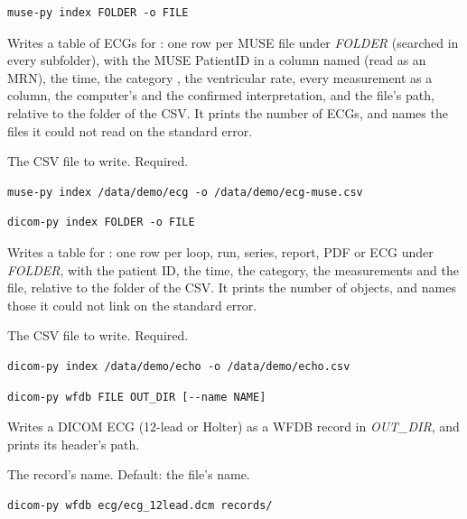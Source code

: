 \begin{lstlisting}[style=signature]
muse-py index FOLDER -o FILE
\end{lstlisting}
Writes a table of ECGs for : one row per MUSE file under \textit{FOLDER} (searched in every
subfolder), with the MUSE PatientID in a column named  (read as an MRN),
the time, the category , the ventricular rate, every measurement as a column, the
computer's and the confirmed interpretation, and the file's path, relative to the folder of the
CSV. It prints the number of ECGs, and names the files it could not
read on the standard error.
\begin{params}
\item[-o, --output FILE] The CSV file to write. Required.
\end{params}
\begin{lstlisting}[style=shell]
muse-py index /data/demo/ecg -o /data/demo/ecg-muse.csv
\end{lstlisting}

\begin{lstlisting}[style=signature]
dicom-py index FOLDER -o FILE
\end{lstlisting}
Writes a table for : one row per loop, run, series, report, PDF or ECG under
\textit{FOLDER}, with the patient ID, the time, the category, the measurements and the file,
relative to the folder of the CSV. It prints the number of objects, and names those it could not
link on the standard error.
\begin{params}
\item[-o, --output FILE] The CSV file to write. Required.
\end{params}
\begin{lstlisting}[style=shell]
dicom-py index /data/demo/echo -o /data/demo/echo.csv
\end{lstlisting}

\begin{lstlisting}[style=signature]
dicom-py wfdb FILE OUT_DIR [--name NAME]
\end{lstlisting}
Writes a DICOM ECG (12-lead or Holter) as a WFDB record in \textit{OUT\_DIR}, and prints its
header's path.
\begin{params}
\item[--name NAME] The record's name. Default: the file's name.
\end{params}
\begin{lstlisting}[style=shell]
dicom-py wfdb ecg/ecg_12lead.dcm records/
\end{lstlisting}

